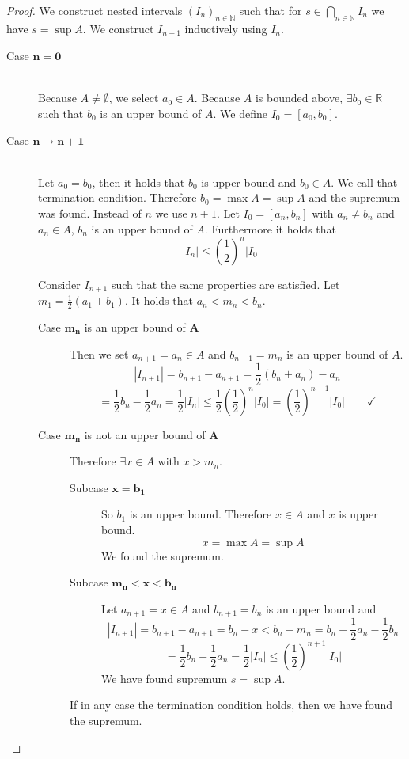 \documentclass[a4paper,landscape,twocolumn]{article}
\theoremstyle{definition}
\newcommand\abs[1]{\left|#1\right|}
\begin{document}
\begin{proof}
  We construct nested intervals $(I_n)_{n \in \mathbb N}$ such that
  for $s \in \bigcap_{n \in \mathbb N} I_n$ we have $s = \sup{A}$.
  We construct $I_{n+1}$ inductively using $I_n$.

  \begin{description}
    \item[Case $\mathbf{n = 0}$] \hfill{} \\
      Because $A \neq \emptyset$, we select $a_0 \in A$.
      Because $A$ is bounded above, $\exists b_0 \in \mathbb R$
      such that $b_0$ is an upper bound of $A$.
      We define $I_0 = [a_0, b_0]$.
    \item[Case $\mathbf{n \to n + 1}$] \hfill{} \\
      Let $a_0 = b_0$, then it holds that $b_0$ is upper bound and $b_0 \in A$.
      We call that termination condition.
      Therefore $b_0 = \max{A} = \sup{A}$ and the supremum was found.
      Instead of $n$ we use $n + 1$.
      Let $I_0 = [a_n, b_n]$ with $a_n \neq b_n$ and $a_n \in A$,
      $b_n$ is an upper bound of $A$. Furthermore it holds that
      \[ \abs{I_n} \leq \left(\frac12\right)^n \abs{I_0} \]

      Consider $I_{n+1}$ such that the same properties are satisfied.
      Let $m_1 = \frac12 (a_1 + b_1)$. It holds that $a_n < m_n < b_n$.

      \begin{description}
        \item[Case $\mathbf{m_n}$ is an upper bound of $\mathbf{A}$]
          Then we set $a_{n+1} = a_n \in A$ and
          $b_{n+1} = m_n$ is an upper bound of $A$.
          \[ \abs{I_{n+1}} = b_{n+1} - a_{n+1} = \frac12 (b_n + a_n) - a_n \]
          \[
            = \frac12 b_n - \frac12 a_n = \frac12 \abs{I_n}
            \leq \frac12 \left(\frac12\right)^n \abs{I_0}
            = \left(\frac12\right)^{n+1} \abs{I_0}
            \qquad \checkmark
          \]
        \item[Case $\mathbf{m_n}$ is not an upper bound of $\mathbf{A}$]
          Therefore $\exists x \in A$ with $x > m_n$.
          \begin{description}
            \item[Subcase $\mathbf{x = b_1}$]
              So $b_1$ is an upper bound.
              Therefore $x \in A$ and $x$ is upper bound.
              \[ x = \max{A} = \sup{A} \]
              We found the supremum.
            \item[Subcase $\mathbf{m_n < x < b_n}$]
              Let $a_{n+1} = x \in A$ and $b_{n + 1} = b_n$ is an upper bound
              and
              \[
                  \abs{I_{n + 1}} = b_{n+1} - a_{n+1} = b_n - x
                  < b_n - m_n = b_n - \frac12 a_n - \frac12 b_n
              \] \[
                  = \frac12 b_n - \frac12 a_n
                  = \frac12 \abs{I_n} \leq \left(\frac12\right)^{n+1} \abs{I_0}
              \]
              We have found supremum $s = \sup{A}$.
          \end{description}
          If in any case the termination condition holds, then we have found
          the supremum.


\end{description}
\end{description}
\end{proof}
\end{document}
